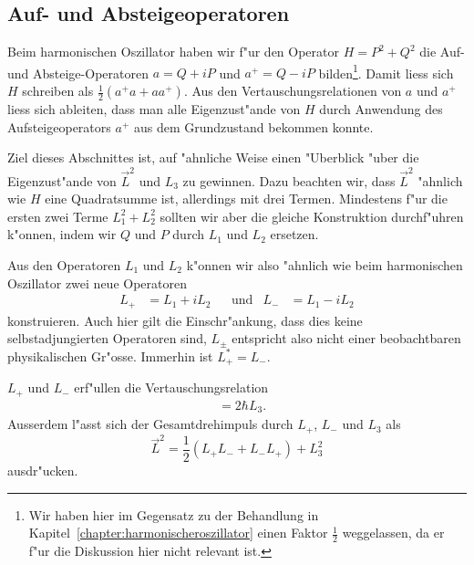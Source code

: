 \subsection{Auf- und Absteigeoperatoren}
%
%
Beim harmonischen Oszillator haben wir f"ur den Operator $H=P^2+Q^2$ die
Auf- und Absteige-Operatoren $a=Q+iP$ und $a^+=Q-iP$ bilden\footnote{Wir haben
hier im Gegensatz zu der Behandlung in
Kapitel~\ref{chapter:harmonischeroszillator} einen Faktor $\frac12$ 
weggelassen, da er f"ur die Diskussion hier nicht relevant ist.}.
Damit liess sich $H$ schreiben als $\frac12(a^+a+aa^+)$. Aus den
Vertauschungsrelationen von $a$ und $a^+$ liess sich ableiten, dass
man alle Eigenzust"ande von $H$ durch Anwendung des Aufsteigeoperators 
$a^+$ aus dem Grundzustand bekommen konnte.

Ziel dieses Abschnittes ist, auf "ahnliche Weise einen "Uberblick 
"uber die Eigenzust"ande von $\vec L^2$ und $L_3$ zu gewinnen.
Dazu beachten wir, dass $\vec L^2$ "ahnlich wie $H$ eine Quadratsumme
ist, allerdings mit drei Termen.
Mindestens f"ur die ersten zwei Terme $L_1^2+L_2^2$ sollten wir
aber die gleiche Konstruktion durchf"uhren k"onnen, indem wir
$Q$ und $P$ durch $L_1$ und $L_2$ ersetzen.

Aus den Operatoren $L_1$ und $L_2$ k"onnen wir also "ahnlich wie beim
harmonischen Oszillator zwei neue Operatoren
\begin{equation*}
\begin{aligned}
L_+&=L_1+iL_2
&
&\text{und}&
L_-&=L_1-iL_2
\end{aligned}
\end{equation*}
konstruieren.
Auch hier gilt die Einschr"ankung, dass dies keine selbstadjungierten
Operatoren sind, $L_\pm$ entspricht also nicht einer beobachtbaren
physikalischen Gr"osse. 
Immerhin ist $L_+^*=L_-$.

\begin{hilfssatz}
$L_+$ und $L_-$ erf"ullen die Vertauschungsrelation
\begin{align*}
[L_+, L_-]&=2\hbar L_3.
\end{align*}
Ausserdem l"asst sich der Gesamtdrehimpuls durch $L_+$, $L_-$ und $L_3$ als
\[
\vec L^2 = \frac12(L_+L_- + L_-L_+)+L_3^2
\]
ausdr"ucken.
\end{hilfssatz}

